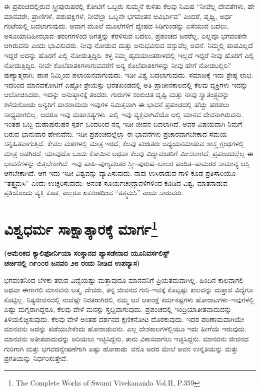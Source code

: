 ಈ ಪ್ರಪಂಚದಲ್ಲಿರುವ ಸ್ತ್ರೀಪುರುಷರಲ್ಲಿ ಕೋಟಿಗೆ ಒಬ್ಬರು ಸುಮ್ಮನೆ ಕುಳಿತು ಕೆಲವು ನಿಮಿಷ “ನೀವೆಲ್ಲ ದೇವತೆಗಳು, ಹೇ ಮಾನವರೇ, ಪ್ರಾಣಿಗಳೆ, ಪಶುಪಕ್ಷಿಗಳೆ, ನೀವೆಲ್ಲಾ ಒಬ್ಬನೇ ಭಗವಂತನ ಆವಿರ್ಭಾವ” ಎಂದರೆ, ಪೃಥ್ವಿ, ಅರ್ಧ ಗಂಟೆಯಲ್ಲಿ ಬದಲಾಗುವುದು. ಆವಾಗ ಮೂಲೆ ಮೂಲೆಗಳಿಗೆ ದ್ವೇಷದ ಸಿಡಿಗುಂಡನ್ನು ಎಸೆಯುವ ಬದಲು, ಅಸೂಯಾದಿಹೀನಭಾವ–ತರಂಗಗಳಿಂದ ಜಗತ್ತನ್ನು ಕೆರಳಿಸುವ ಬದಲು, ಪ್ರಪಂಚದ ಜನರೆಲ್ಲ, ಎಲ್ಲವೂ ಭಗವಂತನೇ ಆಗಿರುವನು ಎಂದು ಭಾವಿಸುವರು. ನೀವು ನೋಡುವ ಮತ್ತು ಅನುಭವಿಸುವ ವಸ್ತುವೆಲ್ಲ ಅವನೆ. ನಿಮ್ಮಲ್ಲಿ ಪಾಪವಿಲ್ಲದೆ ಇದ್ದರೆ ಅದನ್ನು ಹೊರಗೆ ಎಲ್ಲಿ ನೋಡುತ್ತಿದ್ದಿರಿ. ಕಳ್ಳ ನಿಮ್ಮ ಹೃದಯಾಂತರಾಳದಲ್ಲಿ ಇಲ್ಲದೆ ಇದ್ದರೆ ನೀವು ಹೊರಗೆ ಎಲ್ಲಿ ನೋಡುತ್ತಿದ್ದಿರಿ. ನೀವೇ ಕೊಲೆಪಾತಕಿಗಳಾಗುವವರೆಗೆ ಅನ್ಯ ಕೊಲೆಪಾತಕಿಗಳನ್ನು ನೀವು ಹೇಗೆ ನೋಡಬಲ್ಲಿರಿ? ಪುಣ್ಯಾತ್ಮರಾಗಿ; ಪಾಪ ನಿಮ್ಮಿಂದ ಪಲಾಯನವಾಗುವುದು. ಇಡೀ ವಿಶ್ವ ಬದಲಾಗುವುದು. ಸಮಾಜಕ್ಕೆ ಇದು ಶ್ರೇಷ್ಠ ಲಾಭ. ಇದರಿಂದ ಮಾನವಕೋಟಿಗೆ ಎಷ್ಟೋ ಶ್ರೇಯಸ್ಸು ಭರತಖಂಡದಲ್ಲಿ ಅತಿ ಪ್ರಾಚೀನಕಾಲದಲ್ಲಿ ಕೆಲವು ವ್ಯಕ್ತಿಗಳು ಇದನ್ನು ಆಲೋಚಿಸಿದರು, ಇದನ್ನು ಅನುಷ್ಠಾನಕ್ಕೆ ತಂದರು. ಗುರುಗಳ ಸಂಕುಚಿತ ದೃಷ್ಟಿ ಮತ್ತು ನಾವು ಸ್ವಾತಂತ್ರ್ಯವನ್ನು ಕಳೆದುಕೊಂಡು ಅನ್ಯರಿಗೆ ದಾಸರಾದುದು ಇವುಗಳ ನಿಮಿತ್ತವಾಗಿ ಈ ಭಾವನೆ ಪ್ರಪಂಚದಲ್ಲಿ ಹೆಚ್ಚು ಹರಡಲು ಸಾಧ್ಯವಾಗಲಿಲ್ಲ. ಆದರೂ ಇವು ಮಹಾಸತ್ಯಗಳು. ಎಲ್ಲಿ ಇವು ವ್ಯಕ್ತವಾಗಿವೆಯೊ ಅಲ್ಲಿ ಮಾನವ ದೇವನಾಗಿರುವನು. ಇಂತಹ ಒಬ್ಬ ಮಹಾಪುರುಷರ ಸ್ಪರ್ಶ ಒಂದರಿಂದ ನನ್ನ ಇಡೀ ಜೀವನ ಬದಲಾಗಿದೆ. ಅವರ ವಿಷಯವಾಗಿ ನಿಮಗೆ ಬರುವ ಭಾನುವಾರ ಹೇಳುವೆನು. ಇಡೀ ಪ್ರಪಂಚದಲ್ಲೆಲ್ಲಾ ಈ ಭಾವನೆಗಳು ಪ್ರಚಾರವಾಗಬೇಕಾದ ಸಮಯ ಸನ್ನಿಹಿತವಾಗುತ್ತಿದೆ. ಕೇವಲ ಮಠಗಳಲ್ಲಿ ಮಾತ್ರ ಇರದೆ, ಕೆಲವು ಪಂಡಿತರು ಅಧ್ಯಯನಮಾಡುವ ಶಾಸ್ತ್ರ ಗ್ರಂಥಗಳಲ್ಲಿ ಮಾತ್ರ ಅಡಗಿರದೆ, ಯಾವುದೊ ಒಂದು ಕೋಮಿನ ಅಥವಾ ಕೆಲವು ವಿದ್ಯಾವಂತರಿಗೆ ಮೀಸಲಾಗದೆ, ಪ್ರಪಂಚದಲ್ಲೆಲ್ಲ ಈ ಭಾವನೆಗಳನ್ನು ಬಿತ್ತಬೇಕಾಗಿದೆ. ಇವು ಪಾಪಿ–ಪುಣ್ಯವಂತರ ಸ್ತ್ರೀ–ಪುರುಷ–ಬಾಲರ ಪಂಡಿತ–ಪಾಮರರ ಸಾಮಾನ್ಯ ಆಸ್ತಿ ಆಗಬೇಕಾಗಿದೆ. ಆಗ ಇದು ಇಡೀ ವಿಶ್ವವನ್ನು ವ್ಯಾಪಿಸುವುದು. ನಾವು ಉಸಿರಾಡುವ ಗಾಳಿ ಕೂಡ ಪ್ರತಿಸಾರಿಯೂ “ತತ್ತ್ವಮಸಿ” ಎಂದು ಉಚ್ಚರಿಸುವುದು. ಅನಂತ ಸೂರ್ಯಚಂದ್ರಾವಳಿಗಳಿಂದ ಕೂಡಿದ ವಿಶ್ವ, ಮಾತನಾಡುವ ಪ್ರತಿಯೊಂದು ವ್ಯಕ್ತಿ ಕೂಡ, ಎಲ್ಲರೂ ಏಕಕಂಠದಿಂದ “ತತ್ತ್ವಮಸಿ” ಎಂದು ಸಾರುವರು.

\chapter[ವಿಶ್ವಧರ್ಮ ಸಾಕ್ಷಾತ್ಕಾರಕ್ಕೆ ಮಾರ್ಗ]{ವಿಶ್ವಧರ್ಮ ಸಾಕ್ಷಾತ್ಕಾರಕ್ಕೆ ಮಾರ್ಗ\protect\footnote{The Complete Works of Swami Vivekananda Vol.II, P.359}}%

\begin{center}
\textbf{(ಅಮೆರಿಕದ ಕ್ಯಾಲಿಫೋರ್ನಿಯಾ ಸಂಸ್ಥಾನದ ಪ್ಯಾಸಡೇನಾದ ಯೂನಿವರ್ಸಲಿಸ್ಟ್​ \\ ಚರ್ಚಿನಲ್ಲಿ ೧೯೦೦ರ ಜನವರಿ ೨೮ ರಂದು ನೀಡಿದ ಉಪನ್ಯಾಸ)}
\end{center}

ಭಗವಂತನಿಂದ ಬೆಳಕು ತರುವ ವಿದ್ಯೆಯಷ್ಟು ಮತ್ತಾವುದೂ ಮಾನವನಿಗೆ ಪ್ರಿಯತಮವಾಗಿಲ್ಲ. ಹಿಂದಿನ ಕಾಲವಾಗಲಿ ಅಥವಾ ಈಗಾಗಲಿ ಮಾನವನು ಆತ್ಮ, ದೇವರು, ತನ್ನ ಜೀವನದ ಗುರಿ–ಇವಕ್ಕೆ ಕೊಟ್ಟಷ್ಟು ಕಾಲವನ್ನು ಮತ್ತಾವ ವಿದ್ಯೆಗೂ ಕೊಟ್ಟಿಲ್ಲ. ನಿತ್ಯಜೀವನದಲ್ಲಿ ನಾವೆಷ್ಟೇ ನಿರತರಾಗಿರಲಿ, ನಮ್ಮ ಆಸೆ ಆಕಾಂಕ್ಷೆ ಕರ್ಮಕಷ್ಟಗಳು ಹೋರಾಟಗಳು–ಇವುಗಳಲ್ಲಿ ಎಷ್ಟು ಮಗ್ನರಾಗಿದ್ದರೂ, ಕೆಲವು ವೇಳೆ ಮನಸ್ಸು ಸ್ತಬ್ದವಾಗುವುದು, ಪ್ರಪಂಚದಲ್ಲಿ ಇಂದ್ರಿಯಾತೀತವಾದುದನ್ನು ತಿಳಿಯಲಿಚ್ಛಿಸುವುದು. ಕೆಲವು ವೇಳೆ ಅಂತಹ ದರ್ಶನದ ಕ್ಷಣಿಕನೋಟ ದೊರಕುವುದು. ಇದರ ಪರಿಣಾಮವಾಗಿಯೇ ಮಾನವನು ಅದನ್ನು ಪಡೆಯಬೇಕೆಂದು ಹೋರಾಡುವನು. ಎಲ್ಲ ದೇಶಕಾಲಗಳಲ್ಲಿಯೂ ಇದು ಹೀಗೆಯೆ ಇರುವುದು. ಮಾನವನು ಅತೀತವಾದುದನ್ನು ಅರಿಯಲು ಇಚ್ಛಿಸಿದ್ದನು, ತಾನು ವಿಕಾಸವಾಗಲು ಇಚ್ಛಿಸಿದ್ದನು. ಮಾನವನು ಜೀವನದ ಗುರಿಗಾಗಿ ಮತ್ತು ಭಗವದನ್ವೇಷಣೆಗಾಗಿ ಎಷ್ಟು ಹೋರಾಡು\break\ ವನೊ ಅದರ ಮೇಲೆ ಅವನ ಉನ್ನತಿಯನ್ನು ಮತ್ತು ಪ್ರಗತಿಯನ್ನು ನಿರ್ಧರಿಸುತ್ತೇವೆ.

